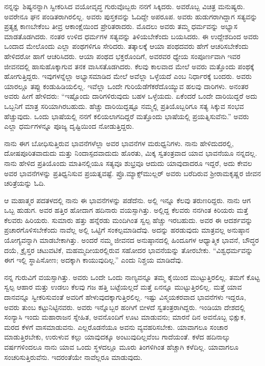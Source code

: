 ನನ್ನನ್ನು ಶಿಷ್ಯನನ್ನಾಗಿ ಸ್ವೀಕರಿಸಿದ ವಯೋವೃದ್ಧ ಗುರುವೊಬ್ಬರು ನನಗೆ ಸಿಕ್ಕಿದರು. ಅವರೊಬ್ಬ ವಿಚಿತ್ರ ಮನುಷ್ಯರು. ಅವರೇನೂ ಘನ ಪಂಡಿತರಾಗಿರಲಿಲ್ಲ. ಅವರು ಪುಸ್ತಕವನ್ನು ಓದಿದ್ದೇ ಅಪರೂಪ. ಅವರು ಹುಡುಗರಾಗಿದ್ದಾಗ ಸತ್ಯವನ್ನು ಪ್ರತ್ಯಕ್ಷ ಕಾಣಬೇಕೆಂಬ ತೀವ್ರ ಆಕಾಂಕ್ಷೆಯಿಂದ ಪ್ರೇರಿತರಾದರು. ಮೊದಲು ಅವರು ತಮ್ಮ ಧರ್ಮವನ್ನು ಅಭ್ಯಾಸ ಮಾಡತೊಡಗಿದರು. ನಂತರ ಉಳಿದ ಧರ್ಮಗಳ ಸತ್ಯವನ್ನು ತಿಳಿಯಬೇಕೆಂದು ಬಯಸಿದರು. ಈ ಉದ್ದೇಶದಿಂದ ಅವರು ಒಂದಾದ ಮೇಲೊಂದು ಎಲ್ಲಾ ಪಂಥಗಳಿಗೂ ಸೇರಿದರು. ತತ್ಕಾಲಕ್ಕೆ ಆಯಾ ಪಂಥದವರು ಹೇಗೆ ಆಚರಿಸಬೇಕೆಂದು ಹೇಳಿದರೋ ಹಾಗೆ ಆಚರಿಸಿದರು. ಆಯಾ ಪಂಥದ ಭಕ್ತರೊಂದಿಗೆ, ಅವರವರ ಧ್ಯೇಯ ಸಂಪೂರ್ಣವಾಗಿ ಇವರ ಜೀವನದಲ್ಲಿ ಹಾಸುಹೊಕ್ಕಾಗುವ ತನಕ ವಾಸಿಸತೊಡಗಿದರು. ಕೆಲವು ಕಾಲವಾದ ಮೇಲೆ ಅವರು ಮತ್ತೊಂದು ಪಂಥಕ್ಕೆ ಹೋಗುತ್ತಿದ್ದರು. ಇವುಗಳನ್ನೆಲ್ಲಾ ಅಭ್ಯಾಸಮಾಡಿದ ಮೇಲೆ ಅವೆಲ್ಲಾ ಒಳ್ಳೆಯದೆ ಎಂಬ ನಿರ್ಧಾರಕ್ಕೆ ಬಂದರು. ಅವರು ಯಾರಲ್ಲೂ ತಪ್ಪು ಕಂಡುಹಿಡಿಯಲಿಲ್ಲ. ಇವೆಲ್ಲಾ ಒಂದೇ ಗುರಿಯೆಡೆಗೆ\break ಕರೆದೊಯ್ಯುವ ಹಲವು ದಾರಿಗಳು. ಅನಂತರ ಅವರು ಹೀಗೆ ಹೇಳಿದರು: “ಇಷ್ಟೊಂದು ದಾರಿಗಳಿರುವುದು ಬಹಳ ಒಳ್ಳೆಯದು. ಏಕೆಂದರೆ ಒಂದೇ ದಾರಿಯಿದ್ದರೆ ಅದು ಒಬ್ಬನಿಗೆ ಮಾತ್ರ ಸರಿಯಾಗಿರಬಹುದು. ಹೆಚ್ಚು ದಾರಿಯಿದ್ದಷ್ಟೂ ನಮ್ಮಲ್ಲಿ ಪ್ರತಿಯೊಬ್ಬರಿಗೂ ಸತ್ಯ ಸಿಕ್ಕುವ ಸಂಭವ ಹೆಚ್ಚುವುದು. ಒಂದು ಭಾಷೆಯಲ್ಲಿ ನನಗೆ ಕಲಿಯಲಾಗದಿದ್ದರೆ ಮತ್ತೊಂದು ಭಾಷೆಯಲ್ಲಿ ಪ್ರಯತ್ನಿಸುವೆನು.” ಅವರು ಎಲ್ಲಾ ಧರ್ಮಗಳನ್ನೂ ಪೂಜ್ಯ ದೃಷ್ಟಿಯಿಂದ ನೋಡುತ್ತಿದ್ದರು.

ನಾನು ಈಗ ಬೋಧಿಸುತ್ತಿರುವ ಭಾವನೆಗಳೆಲ್ಲಾ ಅವರ ಭಾವನೆಗಳ ಮರುಧ್ವನಿಗಳು. ನಾನು ಹೇಳಿದುದರಲ್ಲಿ, ದೋಷಪೂರಿತವಾದುದು ಮತ್ತು ನಿಂದಾಸ್ಪದವಾದುದು ಹೊರತು, ಮಿಕ್ಕ ಸ್ವತಂತ್ರವಾದ ಯಾವ ಭಾವನೆಯೂ ನನ್ನದಲ್ಲ. ನಾನು ಹೇಳಿದ ಪ್ರತಿಯೊಂದು ಮಾತಿನಲ್ಲಿಯೂ ಸತ್ಯವೂ ಶುಭ್ರವೂ ಆದುದು ಯಾವುದಾದರೂ ಇದ್ದರೆ, ಅದು ಕೇವಲ ಅವರ ಭಾವನೆಗಳನ್ನು ಪ್ರತಿಧ್ವನಿಸುವ ಪ್ರಯತ್ನವಷ್ಟೆ. ಪ್ರೊ.\break ಮ್ಯಾಕ್ಸ್‌ಮುಲ್ಲರ್ ಅವರು ಬರೆದಿರುವ ಶ‍್ರೀರಾಮಕೃಷ್ಣರ ಜೀವನ ಚರಿತ್ರೆಯನ್ನು ಓದಿ.

ಆ ಮಹಾತ್ಮರ ಪದತಳದಲ್ಲಿ ನಾನು ಈ ಭಾವನೆಗಳನ್ನು ಪಡೆದೆನು. ಅಲ್ಲಿ ಇನ್ನೂ ಕೆಲವು ತರುಣರಿದ್ದರು. ನಾನು ಆಗ ಒಬ್ಬ ಹುಡುಗ. ಅವರ ಹತ್ತಿರ ಹೋದಾಗ ಹದಿನಾರು ವಯಸ್ಸಾಗಿತ್ತು. ಅಲ್ಲಿದ್ದ ಕೆಲವರು ನನಗಿಂತ ಕಿರಿಯರು ಮತ್ತೆ ಕೆಲವರು ಹಿರಿಯರು. ಸುಮಾರು ಹತ್ತು ಹನ್ನೆರಡು ಮಂದಿಗಿಂತ ಸ್ವಲ್ಪ ಹೆಚ್ಚು ಇರಬಹುದು. ಅವರ ಈ ಆದರ್ಶವನ್ನು ಪ್ರಚಾರಗೊಳಿಸಬೇಕೆಂದು ನಾವೆಲ್ಲ ಅಲ್ಲಿ ಒಟ್ಟಿಗೆ ಸಂಕಲ್ಪಮಾಡಿದೆವು. ಅದನ್ನು ಹರಡುವುದು ಮಾತ್ರವಲ್ಲ ಅನುಷ್ಠಾನ ಯೋಗ್ಯವನ್ನಾಗಿ ಮಾಡಬೇಕಾಗಿತ್ತು. ಅಂದರೆ ನಮ್ಮ ಜೀವನದ ಅನುಷ್ಠಾನದಲ್ಲಿ ಹಿಂದೂಗಳ ಆಧ್ಯಾತ್ಮಿಕ ಭಾವನೆ, ಬೌದ್ಧರ ದಯೆ, ಕ್ರೈಸ್ತರ ಚಟುವಟಿಕೆ, ಮಹಮ್ಮದೀಯರಲ್ಲಿರುವ ಸಹೋದರ ಭಾವನೆಯನ್ನು ತೋರಬೇಕು. “ವಿಶ್ವಧರ್ಮವನ್ನು ಈಗ ಇಲ್ಲಿ ಸ್ಥಾಪಿಸೋಣ; ಅದಕ್ಕಾಗಿ ಕಾಯುವುದಿಲ್ಲ.” ಎಂದು ನಿಶ್ಚಯ ಮಾಡಿದೆವು.

ನನ್ನ ಗುರುವಿಗೆ ವಯಸ್ಸಾಗಿತ್ತು. ಅವರು ಒಂದೇ ಒಂದು ನಾಣ್ಯವನ್ನೂ ತಮ್ಮ ಕೈಯಿಂದ ಮುಟ್ಟುತ್ತಿರಲಿಲ್ಲ. ತಮಗೆ ಕೊಟ್ಟ ಸ್ವಲ್ಪ ಆಹಾರ ಮತ್ತು ಉಡಲು ಕೆಲವು ಗಜ ಹತ್ತಿ ಬಟ್ಟೆಯಲ್ಲದೆ ಮತ್ತೆ ಏನನ್ನೂ ಮುಟ್ಟುತ್ತಿರಲಿಲ್ಲ. ಮತ್ತೆ ಯಾವ ದಾನವನ್ನೂ ಸ್ವೀಕರಿಸುವಂತೆ ಅವರಿಗೆ ಹೇಳುವುದಕ್ಕಾಗುತ್ತಿರಲಿಲ್ಲ. ಇಷ್ಟು ವಿಸ್ಮಯಕರವಾದ ಭಾವನೆಗಳು ಇದ್ದರೂ, ಅವರು ತುಂಬ ಕಟ್ಟುನಿಟ್ಟಿನವರು. ಅವರು ಇನ್ನೊಬ್ಬರ ಹಂಗಿಗೆ ಬೀಳದೆ ಸ್ವತಂತ್ರರಾಗಿದ್ದರು. ಇಂಡಿಯಾ ದೇಶದಲ್ಲಿ ಸಂನ್ಯಾಸಿ ಇಂದು ಮಹಾರಾಜನ ಸ್ನೇಹಿತ, ಅವನೊಂದಿಗೆ ಊಟ ಮಾಡುವನು; ಮಾರನೆ ದಿನ ಅವನೊಬ್ಬ ಭಿಕ್ಷುಕ, ಮರದ ಕೆಳಗೆ ವಾಸಮಾಡುವನು. ಎಲ್ಲರೊಡನೆಯೂ ಅವನು ವ್ಯವಹರಿಸಬೇಕು. ಯಾವಾಗಲೂ ಸಂಚಾರ ಮಾಡುತ್ತಿರಬೇಕು, ಉರುಳುವ ಕಲ್ಲು ಯಾವುದಕ್ಕೂ ಅಂಟುವುದಿಲ್ಲವೆಂಬ ಗಾದೆಯಂತೆ. ಕಳೆದ ಹದಿನಾಲ್ಕು ವರ್ಷಗಳಿಂದಲೂ ನಾನು ಯಾವ ಒಂದು ಸ್ಥಳದಲ್ಲೂ ಮೂರು ತಿಂಗಳಿಗಿಂತ ಹೆಚ್ಚಾಗಿ ಕಳೆದಿಲ್ಲ. ಯಾವಾಗಲೂ ಸಂಚರಿಸುತ್ತಿರುವೆನು. ಇದರಂತೆಯೇ ನಾವೆಲ್ಲರೂ ಮಾಡುವುದು.

